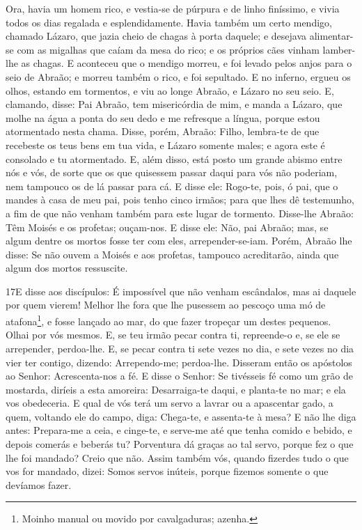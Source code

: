 Ora, havia um homem rico, e vestia-se de púrpura e de linho
finíssimo, e vivia todos os dias regalada e esplendidamente.
Havia também um certo mendigo, chamado Lázaro, que jazia
cheio de chagas à porta daquele; e desejava alimentar-se com
as migalhas que caíam da mesa do rico; e os próprios cães vinham
lamber-lhe as chagas. E aconteceu que o mendigo morreu, e foi
levado pelos anjos para o seio de Abraão; e morreu também o rico, e
foi sepultado. E no inferno, ergueu os olhos, estando em
tormentos, e viu ao longe Abraão, e Lázaro no seu seio. E,
clamando, disse: Pai Abraão, tem misericórdia de mim, e manda a
Lázaro, que molhe na água a ponta do seu dedo e me refresque a
língua, porque estou atormentado nesta chama. Disse, porém,
Abraão: Filho, lembra-te de que recebeste os teus bens em tua vida,
e Lázaro somente males; e agora este é consolado e tu atormentado.
E, além disso, está posto um grande abismo entre nós e vós,
de sorte que os que quisessem passar daqui para vós não poderiam,
nem tampouco os de lá passar para cá. E disse ele: Rogo-te,
pois, ó pai, que o mandes à casa de meu pai, pois tenho cinco
irmãos; para que lhes dê testemunho, a fim de que não venham também
para este lugar de tormento. Disse-lhe Abraão: Têm Moisés e
os profetas; ouçam-nos. E disse ele: Não, pai Abraão; mas, se
algum dentre os mortos fosse ter com eles, arrepender-se-iam.
Porém, Abraão lhe disse: Se não ouvem a Moisés e aos
profetas, tampouco acreditarão, ainda que algum dos mortos
ressuscite.

\medskip

\lettrine{17} E disse aos discípulos: É impossível que não
venham escândalos, mas ai daquele por quem vierem! Melhor lhe
fora que lhe pusessem ao pescoço uma mó de atafona\footnote{Moinho
manual ou movido por cavalgaduras; azenha.}, e fosse lançado ao mar,
do que fazer tropeçar um destes pequenos. Olhai por vós mesmos.
E, se teu irmão pecar contra ti, repreende-o e, se ele se
arrepender, perdoa-lhe. E, se pecar contra ti sete vezes no dia,
e sete vezes no dia vier ter contigo, dizendo: Arrependo-me;
perdoa-lhe. Disseram então os apóstolos ao Senhor:
Acrescenta-nos a fé. E disse o Senhor: Se tivésseis fé como um
grão de mostarda, diríeis a esta amoreira: Desarraiga-te daqui, e
planta-te no mar; e ela vos obedeceria. E qual de vós terá um
servo a lavrar ou a apascentar gado, a quem, voltando ele do campo,
diga: Chega-te, e assenta-te à mesa? E não lhe diga antes:
Prepara-me a ceia, e cinge-te, e serve-me até que tenha comido e
bebido, e depois comerás e beberás tu? Porventura dá graças ao
tal servo, porque fez o que lhe foi mandado? Creio que não.
Assim também vós, quando fizerdes tudo o que vos for mandado,
dizei: Somos servos inúteis, porque fizemos somente o que devíamos
fazer.

